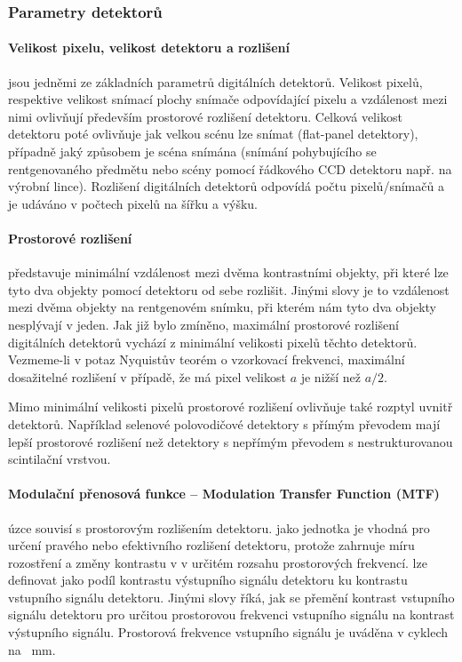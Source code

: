\subsubsection{Parametry detektorů}
\paragraph{Velikost pixelu, velikost detektoru a rozlišení}
jsou jedněmi ze základních parametrů digitálních detektorů. Velikost pixelů, respektive velikost snímací plochy snímače odpovídající pixelu a vzdálenost mezi nimi ovlivňují především prostorové rozlišení detektoru. \cite[str.~682]{Advances-in-Digital-Radiography} Celková velikost detektoru poté ovlivňuje jak velkou scénu lze snímat (flat-panel detektory), případně jaký způsobem je scéna snímána (snímání pohybujícího se rentgenovaného předmětu nebo scény pomocí řádkového CCD detektoru např. na výrobní lince). Rozlišení digitálních detektorů odpovídá počtu pixelů/snímačů a je udáváno v počtech pixelů na šířku a výšku.

\paragraph{Prostorové rozlišení}
představuje minimální vzdálenost mezi dvěma kontrastními objekty, při které lze tyto dva objekty pomocí detektoru od sebe rozlišit. \cite[str.~682]{Advances-in-Digital-Radiography} Jinými slovy je to vzdálenost mezi dvěma objekty na rentgenovém snímku, při kterém nám tyto dva objekty nesplývají v jeden. Jak již bylo zmíněno, maximální prostorové rozlišení digitálních detektorů vychází z minimální velikosti pixelů těchto detektorů. Vezmeme-li v potaz Nyquistův teorém o vzorkovací frekvenci, maximální dosažitelné rozlišení v případě, že má pixel velikost $a$ je nižší než $a/2$. 

Mimo minimální velikosti pixelů prostorové rozlišení ovlivňuje také rozptyl uvnitř detektorů. Například selenové polovodičové detektory s přímým převodem mají lepší prostorové rozlišení než detektory s nepřímým převodem s nestrukturovanou scintilační vrstvou.

\paragraph{Modulační přenosová funkce -- Modulation Transfer Function (MTF)}
úzce souvisí s prostorovým rozlišením detektoru.  jako jednotka je vhodná pro určení pravého nebo efektivního rozlišení detektoru, protože zahrnuje míru rozostření a změny kontrastu v v určitém rozsahu prostorových frekvencí. lze definovat jako podíl kontrastu výstupního signálu detektoru ku kontrastu vstupního signálu detektoru. \cite{Modulacni-Prenosova-Funkce} Jinými slovy  říká, jak se  přemění kontrast vstupního signálu detektoru pro určitou prostorovou frekvenci vstupního signálu na kontrast výstupního signálu. \cite[str.~682]{Advances-in-Digital-Radiography} Prostorová frekvence vstupního signálu je uváděna v cyklech na \SI{}{\mm}.

